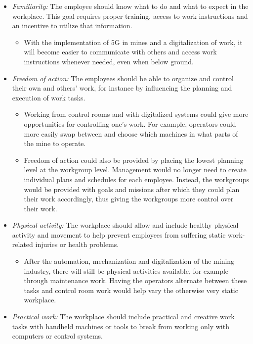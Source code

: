 \documentclass[
  12pt,
]{scrbook}
\providecommand{\tightlist}{%
  \setlength{\itemsep}{0pt}\setlength{\parskip}{0pt}}
\begin{document}
\begin{itemize}
\item
  \emph{Familiarity:} The employee should know what to do and what to expect in the workplace. This goal requires proper training, access to work instructions and an incentive to utilize that information.

  \begin{itemize}
  \tightlist
  \item
    With the implementation of 5G in mines and a digitalization of work, it will become easier to communicate with others and access work instructions whenever needed, even when below ground.
  \end{itemize}
\end{itemize}

\begin{itemize}
\item
  \emph{Freedom of action:} The employees should be able to organize and control their own and others' work, for instance by influencing the planning and execution of work tasks.

  \begin{itemize}
  \item
    Working from control rooms and with digitalized systems could give more opportunities for controlling one's work. For example, operators could more easily swap between and choose which machines in what parts of the mine to operate.
  \item
    Freedom of action could also be provided by placing the lowest planning level at the workgroup level. Management would no longer need to create individual plans and schedules for each employee. Instead, the workgroups would be provided with goals and missions after which they could plan their work accordingly, thus giving the workgroups more control over their work.
  \end{itemize}
\item
  \emph{Physical activity:} The workplace should allow and include healthy physical activity and movement to help prevent employees from suffering static work-related injuries or health problems.

  \begin{itemize}
  \tightlist
  \item
    After the automation, mechanization and digitalization of the mining industry, there will still be physical activities available, for example through maintenance work. Having the operators alternate between these tasks and control room work would help vary the otherwise very static workplace.
  \end{itemize}
\item
  \emph{Practical work:} The workplace should include practical and creative work tasks with handheld machines or tools to break from working only with computers or control systems.


\end{itemize}
\end{document}
